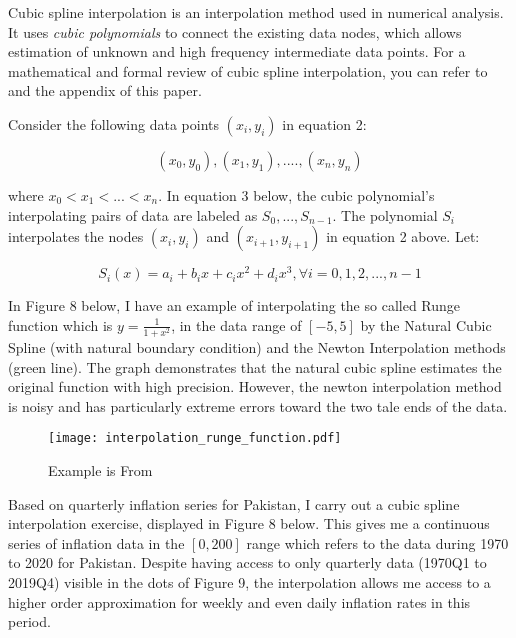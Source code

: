 \documentclass[12pt]{article}
\newcommand{\1}{\mathbbm 1}
\begin{document}
		Cubic spline interpolation is an interpolation method used in numerical analysis. It uses \textit{cubic polynomials} to connect the existing data nodes, which allows estimation of unknown and high frequency intermediate data points. For a mathematical and formal review of cubic spline interpolation, you can refer to \cite{burden2015numerical} and the appendix of this paper.
		
		Consider the following data points $(x_{i}, y_{i})$ in equation 2:
		
		\begin{equation}
			(x_{0}, y_{0}), (x_{1}, y_{1}), .... , (x_{n}, y_{n})
		\end{equation}
		
		
		where $x_{0} < x_{1} < ... < x_{n}$. In equation 3 below, the cubic polynomial's interpolating pairs of data are labeled as $S_{0},..., S_{n-1}$. The polynomial $S_{i}$ interpolates the nodes $(x_{i}, y_{i})$ and $(x_{i+1}, y_{i+1})$ in equation 2 above. Let:
		
		
		\begin{equation}
			S_{i}(x) = a_{i} + b_{i}x + c_{i}x^{2} + d_{i}x^{3}, \forall i = 0, 1, 2, ... ,n-1
		\end{equation}
		
		
		
		In Figure 8 below, I have an example of interpolating the so called Runge function which is $y = \frac{1}{1 + x^{2}}$, in the data range of $[-5, 5]$ by the Natural Cubic Spline (with natural boundary condition) and the Newton Interpolation methods (green line). The graph demonstrates that the natural cubic spline estimates the original function with high precision. However, the newton interpolation method is noisy and has particularly extreme errors toward the two tale ends of the data.
		
		
		
		
		
		
		
		\begin{figure}[H]
			\begin{Center}
				\texttt{[image: interpolation\_runge\_function.pdf]}
				\caption{Example is From \cite{okten2019first}}
			\end{Center}
		\end{figure}
		
		
		Based on quarterly inflation series for Pakistan, I carry out a cubic spline interpolation exercise, displayed in Figure 8 below. This gives me a continuous series of inflation data in the $[0,200]$ range which refers to the data during 1970 to 2020 for Pakistan. Despite having access to only quarterly data (1970Q1 to 2019Q4) visible in the dots of Figure 9, the interpolation allows me access to a higher order approximation for weekly and even daily inflation rates in this period. 
		
\end{document}
